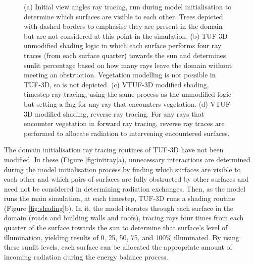 \documentclass[final,3p,times,authoryear]{elsarticle}
\begin{document}
\begin{figure}[!htbp]
{   }
  \hspace{0.5cm}
   \caption{(a) Initial view angles ray tracing, run during model initialisation to determine which surfaces are visible to each other. Trees depicted with dashed borders to emphasise they are present in the domain but are not considered at this point in the simulation. \label{fig:initray} (b) TUF-3D unmodified shading logic in which each surface performs four ray traces (from each surface quarter) towards the sun and determines sunlit percentage based on how many rays leave the domain without meeting an obstruction. Vegetation modelling is not possible in TUF-3D, so is not depicted. \label{fig:shading} (c) VTUF-3D modified shading, timestep ray tracing, using the same process as the unmodified logic but setting a flag for any ray that encounters vegetation. \label{fig:modshading} (d) VTUF-3D modified shading, reverse ray tracing. For any rays that encounter vegetation in forward ray tracing, reverse ray traces are performed to allocate radiation to intervening encountered surfaces. \label{fig:modshadingreverse}} 
\end{figure}


The domain initialisation ray tracing routines of TUF-3D have not been modified. In these (Figure \ref{fig:initray}a), unnecessary interactions are determined during the model initialisation process by finding which surfaces are visible to each other and which pairs of surfaces are fully obstructed by other surfaces and need not be considered in determining radiation exchanges. Then, as the model runs the main simulation, at each timestep, TUF-3D runs a shading routine (Figure \ref{fig:shading}b). In it, the model iterates through each surface in the domain (roads and building walls and roofs), tracing rays four times from each quarter of the surface towards the sun to determine that surface's level of illumination, yielding results of 0, 25, 50, 75, and 100\% illuminated. By using these sunlit levels, each surface can be allocated the appropriate amount of incoming radiation during the energy balance process.
\end{document}
